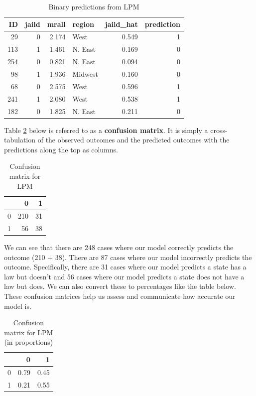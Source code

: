 \documentclass[
]{book}
\begin{document}
\begin{table}

\caption{\label{tab:lpmpointstab}Binary predictions from LPM}
\centering
\begin{tabular}[t]{r|r|r|l|r|r}
\hline
ID & jaild & mrall & region & jaild\_hat & prediction\\
\hline
29 & 0 & 2.174 & West & 0.549 & 1\\
\hline
113 & 1 & 1.461 & N. East & 0.169 & 0\\
\hline
254 & 0 & 0.821 & N. East & 0.094 & 0\\
\hline
98 & 1 & 1.936 & Midwest & 0.160 & 0\\
\hline
68 & 0 & 2.575 & West & 0.596 & 1\\
\hline
241 & 1 & 2.080 & West & 0.538 & 1\\
\hline
182 & 0 & 1.825 & N. East & 0.211 & 0\\
\hline
\end{tabular}
\end{table}

Table \ref{tab:confumat} below is referred to as a \textbf{confusion matrix}. It is simply a cross-tabulation of the observed outcomes and the predicted outcomes with the predictions along the top as columns.

\begin{table}

\caption{\label{tab:confumat}Confusion matrix for LPM}
\centering
\begin{tabular}[t]{l|r|r}
\hline
  & 0 & 1\\
\hline
0 & 210 & 31\\
\hline
1 & 56 & 38\\
\hline
\end{tabular}
\end{table}

We can see that there are 248 cases where our model correctly predicts the outcome (210 + 38). There are 87 cases where our model incorrectly predicts the outcome. Specifically, there are 31 cases where our model predicts a state has a law but doesn't and 56 cases where our model predicts a state does not have a law but does. We can also convert these to percentages like the table below. These confusion matrices help us assess and communicate how accurate our model is.

\begin{table}

\caption{\label{tab:unnamed-chunk-33}Confusion matrix for LPM (in proportions)}
\centering
\begin{tabular}[t]{l|r|r}
\hline
  & 0 & 1\\
\hline
0 & 0.79 & 0.45\\
\hline
1 & 0.21 & 0.55\\
\hline
\end{tabular}
\end{table}
\end{document}
